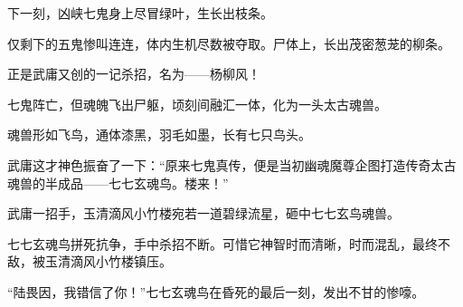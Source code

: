 \begin{this_body}
下一刻，凶峡七鬼身上尽冒绿叶，生长出枝条。

仅剩下的五鬼惨叫连连，体内生机尽数被夺取。尸体上，长出茂密葱茏的柳条。

正是武庸又创的一记杀招，名为——杨柳风！

七鬼阵亡，但魂魄飞出尸躯，顷刻间融汇一体，化为一头太古魂兽。

魂兽形如飞鸟，通体漆黑，羽毛如墨，长有七只鸟头。

武庸这才神色振奋了一下：“原来七鬼真传，便是当初幽魂魔尊企图打造传奇太古魂兽的半成品——七七玄魂鸟。楼来！”

武庸一招手，玉清滴风小竹楼宛若一道碧绿流星，砸中七七玄鸟魂兽。

七七玄魂鸟拼死抗争，手中杀招不断。可惜它神智时而清晰，时而混乱，最终不敌，被玉清滴风小竹楼镇压。

“陆畏因，我错信了你！”七七玄魂鸟在昏死的最后一刻，发出不甘的惨嚎。

\end{this_body}

